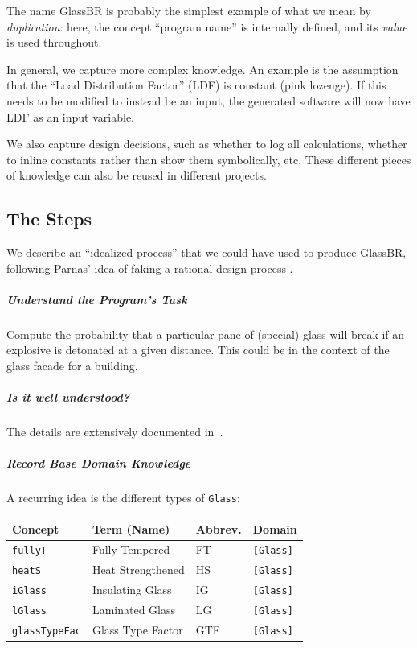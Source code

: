 \documentclass[a4paper,UKenglish,cleveref,autoref,thm-restate]{oasics-v2021}
\begin{document}
The name GlassBR is probably the simplest example of what we mean by
\emph{duplication}: here, the concept ``program name'' is internally defined, and
its \emph{value} is used throughout. 

In general, we capture more complex knowledge. An example is the assumption
that the ``Load Distribution Factor'' (LDF) is constant (pink lozenge). If this
needs to be modified to instead be an input, the generated software will now
have LDF as an input variable.  

We also capture design decisions, such as
whether to log all calculations, whether to inline constants rather than show
them symbolically, etc. These different pieces of knowledge can also be reused
in different projects.

\subsection{The Steps}
We describe an ``idealized process'' that we could have used to produce GlassBR,
following Parnas' idea of faking a rational design process \cite{Parnas1986}.

\subparagraph*{Understand the Program's Task} Compute the probability that a
particular pane of (special) glass will break if an explosive is detonated at a
given distance.  This could be in the context of the glass facade for a
building.

\subparagraph*{Is it well understood?} The details are extensively documented
in~\cite{ASTM2009, ASTM2015, BeasonEtAl1998}.

\subparagraph*{Record Base Domain Knowledge}
A recurring idea is the different types of \texttt{Glass}:
\begin{center}
  \begin{tabular}{|l|l|l|l|}
    \hline
    \textbf{Concept} & \textbf{Term (Name)} & \textbf{Abbrev.} & \textbf{Domain} \\ \hline
    \texttt{fullyT} & Fully Tempered & FT & \texttt{[Glass]} \\ \hline
    \texttt{heatS} & Heat Strengthened & HS & \texttt{[Glass]} \\ \hline
    \texttt{iGlass} & Insulating Glass & IG & \texttt{[Glass]} \\ \hline
    \texttt{lGlass} & Laminated Glass & LG & \texttt{[Glass]} \\ \hline
    \texttt{glassTypeFac} & Glass Type Factor & GTF & \texttt{[Glass]} \\ \hline
  \end{tabular}
\end{center}
\end{document}
